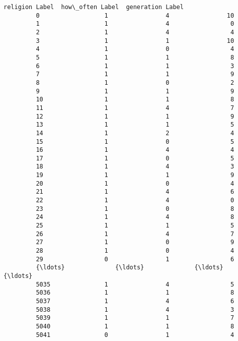 \documentclass[11pt]{article}
\begin{document}
\begin{Verbatim}[commandchars=\\\{\}]
               religion Label  how\_often Label  generation Label  
         0                  1                4                10  
         1                  1                4                 0  
         2                  1                4                 4  
         3                  1                1                10  
         4                  1                0                 4  
         5                  1                1                 8  
         6                  1                1                 3  
         7                  1                1                 9  
         8                  1                0                 2  
         9                  1                1                 9  
         10                 1                1                 8  
         11                 1                4                 7  
         12                 1                1                 9  
         13                 1                1                 5  
         14                 1                2                 4  
         15                 1                0                 5  
         16                 1                4                 4  
         17                 1                0                 5  
         18                 1                4                 3  
         19                 1                1                 9  
         20                 1                0                 4  
         21                 1                4                 6  
         22                 1                4                 0  
         23                 1                0                 8  
         24                 1                4                 8  
         25                 1                1                 5  
         26                 1                4                 7  
         27                 1                0                 9  
         28                 1                0                 4  
         29                 0                1                 6  
         {\ldots}              {\ldots}              {\ldots}               {\ldots}  
         5035               1                4                 5  
         5036               1                1                 8  
         5037               1                4                 6  
         5038               1                4                 3  
         5039               1                1                 7  
         5040               1                1                 8  
         5041               0                1                 4  

\end{Verbatim}
\end{document}
